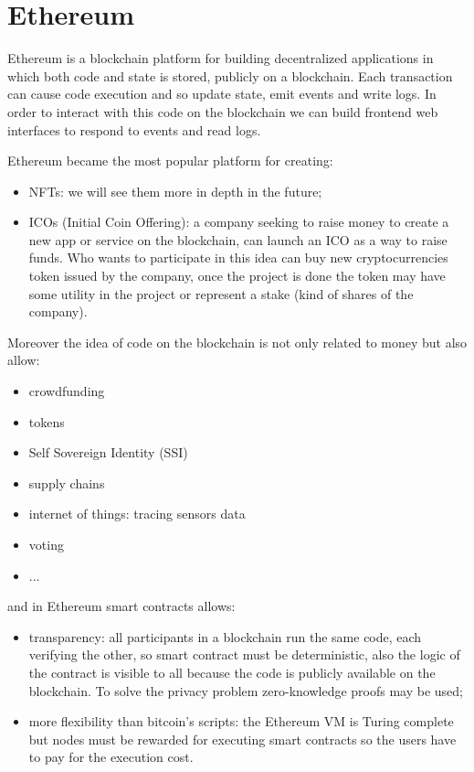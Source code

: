 \section{Ethereum}
Ethereum is a blockchain platform for building decentralized applications in which both code and state is stored, publicly on a blockchain.
Each transaction can cause code execution and so update state, emit events and write logs.
In order to interact with this code on the blockchain we can build frontend web interfaces to respond to events and read logs.

Ethereum became the most popular platform for creating:
\begin{itemize}
    \item NFTs: we will see them more in depth in the future;
    \item ICOs (Initial Coin Offering): a company seeking to raise money to create a new app or service on the blockchain, can launch an ICO as a way to raise funds.
    Who wants to participate in this idea can buy new cryptocurrencies token issued by the company, once the project is done the token may have some utility in the project or represent a stake (kind of shares of the company).
\end{itemize}

Moreover the idea of code on the blockchain is not only related to money but also allow:
\begin{itemize}
    \item crowdfunding
    \item tokens
    \item Self Sovereign Identity (SSI)
    \item supply chains
    \item internet of things: tracing sensors data
    \item voting
    \item ...
\end{itemize}
and in Ethereum smart contracts allows:
\begin{itemize}
    \item transparency: all participants in a blockchain run the same code, each verifying the other, so smart contract must be deterministic, also the logic of the contract is visible to all because the code is publicly available on the blockchain.
    To solve the privacy problem zero-knowledge proofs may be used;

    \item more flexibility than bitcoin's scripts: the Ethereum VM is Turing complete but nodes must be rewarded for executing smart contracts so the users have to pay for the execution cost.
\end{itemize}

